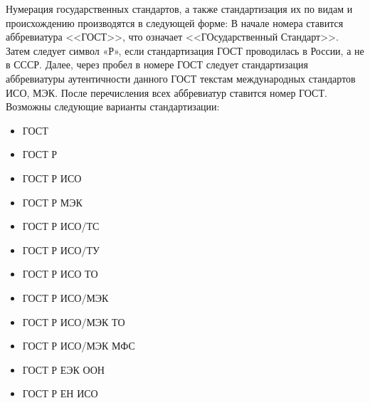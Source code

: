 Нумерация государственных стандартов, а также стандартизация их по видам и происхождению производятся в следующей форме: В начале номера ставится аббревиатура <<ГОСТ>>, что означает <<ГОсударственный Стандарт>>. Затем следует символ «Р», если стандартизация ГОСТ проводилась в России, а не в СССР. Далее, через пробел в номере ГОСТ следует стандартизация аббревиатуры аутентичности данного ГОСТ текстам международных стандартов ИСО, МЭК. После перечисления всех аббревиатур ставится номер ГОСТ. Возможны следующие варианты стандартизации:
\begin{itemize}
\item ГОСТ
\item ГОСТ Р
\item ГОСТ Р ИСО
\item ГОСТ Р МЭК
\item ГОСТ Р ИСО/ТС
\item ГОСТ Р ИСО/ТУ
\item ГОСТ Р ИСО ТО
\item ГОСТ Р ИСО/МЭК
\item ГОСТ Р ИСО/МЭК ТО 
\item ГОСТ Р ИСО/МЭК МФС 
\item ГОСТ Р ЕЭК ООН 
\item ГОСТ Р ЕН ИСО
\end{itemize}